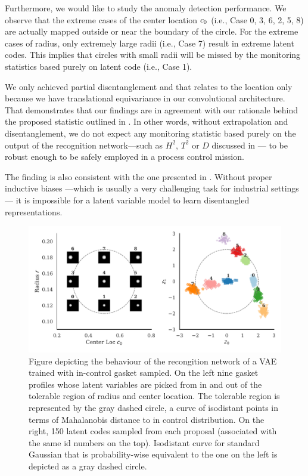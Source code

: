 \documentclass{scrartcl}
\theoremstyle{definition}
\let\ref\Cref
\begin{document}
Furthermore, we would like to study the anomaly detection performance. We observe that the extreme cases of the center location $c_{0}$ (i.e., Case 0, 3, 6, 2, 5, 8) are actually mapped outside or near the boundary of the circle. For the extreme cases of radius, only extremely large radii  (i.e., Case 7) result in extreme latent codes. This implies that circles with small radii will be missed by the monitoring statistics based purely on latent code (i.e., Case 1).

We only achieved partial disentanglement and that relates to the location only because we have translational equivariance in our convolutional architecture.
That demonstrates that our findings are in agreement with our rationale behind the proposed statistic outlined in \ref{sec:proposed-statistic}.
In other words, without extrapolation and disentanglement, we do not expect any monitoring statistic based purely on the output of the recognition network---such as $H^{2}$, $T^{2}$ or $D$ discussed in \ref{sec:bckgrnd:critique}--- to be robust enough to be safely employed in a process control mission.

The finding is also consistent with the one presented in \parencite[Thm. 1]{locatello2018challenging}.
Without proper inductive biases ---which is usually a very challenging task for industrial settings--- it is impossible for a latent variable model to learn disentangled representations. 

\begin{figure}[t]
    
    \includegraphics[width=\linewidth]{figs/proposals.pdf}
    \caption{Figure depicting the behaviour of the recongition network of a VAE trained with in-control gasket sampled. On the left nine gasket profiles whose latent variables are picked from in and out of the tolerable region of radius and center location. The tolerable region is represented by the gray dashed circle, a curve of isodistant points in terms of Mahalanobis distance to in control distribution. On the right, 150 latent codes sampled from each proposal (associated with the same id numbers on the top).  Isodistant curve for standard Gaussian that is probability-wise equivalent to the one on the left is depicted as a gray dashed circle.}
    \label{fig:proposals}
\end{figure}
\end{document}
